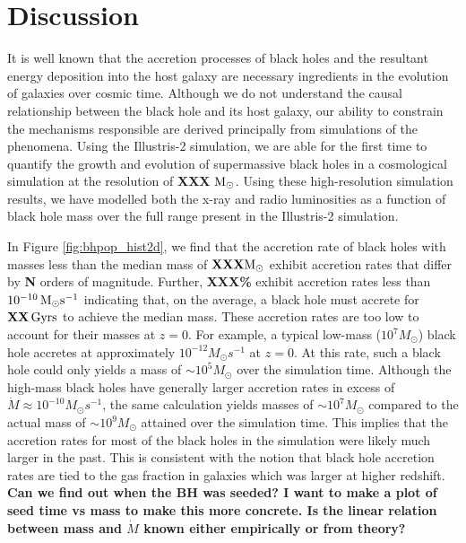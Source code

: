 \section{Discussion}

\label{sec:discussion}It is well known that the accretion processes
of black holes and the resultant energy deposition into the host galaxy
are necessary ingredients in the evolution of galaxies over cosmic
time. Although we do not understand the causal relationship between
the black hole and its host galaxy, our ability to constrain the mechanisms
responsible are derived principally from simulations of the phenomena.
Using the Illustris-2 simulation, we are able for the first time to
quantify the growth and evolution of supermassive black holes in a
cosmological simulation at the resolution of \textbf{XXX }${\rm M_{\odot}}$.
Using these high-resolution simulation results, we have modelled both
the x-ray and radio luminosities as a function of black hole mass
over the full range present in the Illustris-2 simulation.

In Figure \ref{fig:bhpop_hist2d}, we find that the accretion rate
of black holes with masses less than the median mass of $\mathbf{XXX}{\rm M}_{\odot}$
exhibit accretion rates that differ by \textbf{N} orders of magnitude.
Further, \textbf{XXX\%} exhibit accretion rates less than $10^{-10}\,{\rm M_{\odot}s^{-1}}$
indicating that, on the average, a black hole must accrete for $\mathbf{XX}\,{\rm Gyrs}$
to achieve the median mass. These accretion rates are too low to account
for their masses at $z=0$. For example, a typical low-mass ($10^{7}M_{\odot}$)
black hole accretes at approximately $10^{-12}M_{\odot}s^{-1}$ at
$z=0$. At this rate, such a black hole could only yields a mass of
$\sim10^{5}M_{\odot}$ over the simulation time. Although the high-mass
black holes have generally larger accretion rates in excess of $\dot{M}\approx10^{-10}M_{\odot}s^{-1}$,
the same calculation yields masses of $\sim10^{7}M_{\odot}$ compared
to the actual mass of $\sim10^{9}M_{\odot}$ attained over the simulation
time. This implies that the accretion rates for most of the black
holes in the simulation were likely much larger in the past. This
is consistent with the notion that black hole accretion rates are
tied to the gas fraction in galaxies which was larger at higher redshift.
\textbf{Can we find out when the BH was seeded? I want to make a plot
of seed time vs mass to make this more concrete. Is the linear relation
between mass and $\dot{M}$ known either empirically or from theory?}

